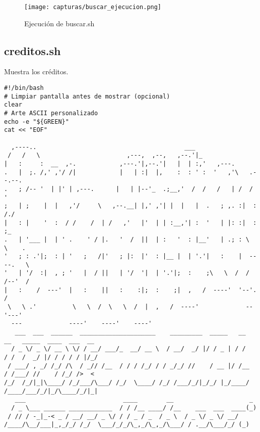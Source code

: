 \documentclass[12pt]{article}
\begin{document}
\begin{figure}[H]
    \centering
    \texttt{[image: capturas/buscar\_ejecucion.png]}
    \caption{Ejecución de buscar.sh}
\end{figure}


\newpage
\subsection{creditos.sh}
Muestra los créditos.

\begin{lstlisting}[caption={creditos.sh}]
#!/bin/bash
# Limpiar pantalla antes de mostrar (opcional)
clear
# Arte ASCII personalizado
echo -e "${GREEN}"
cat << "EOF"
                                            
  ,----..                                         ___                          
 /   /   \                        ,---,  ,--,   ,--.'|_                        
|   :     :  __  ,-.            ,---.'|,--.'|   |  | :,'   ,---.               
.   |  ;. /,' ,'/ /|            |   | :|  |,    :  : ' :  '   ,'\   .--.--.    
.   ; /-- '  | |' | ,---.      |   | |--'_  .;__,'  /  /   /   | /  /    '   
;   | ;    |  |   ,'/     \   ,--.__| |,' ,'| |  |   |  .   ; ,. :|  :  /./   
|   : |    '  :  / /    /  | /   ,'   |'  | | :__,'| :  '   | |: :|  :  ;_     
.   | '___ |  | ' .    ' / |.   '  /  ||  | :   '  : |__'   | .; : \  \    .  
'   ; : .'|;  : | '   ;   /|'   ; |:  |'  : |__ |  | '.'|   :    |  ----.   \ 
'   | '/  :|  , ; '   |  / ||   | '/  '|  | '.'|;  :    ;\   \  /  /  /--'  / 
|   :    /  ---'  |   :    ||   :    :|;  :    ;|  ,   /  ----'  '--'.     /  
 \   \ .'          \   \  /  \   \  /  |  ,   /  ----'             --'---'   
  ---             ----'    ----'    ----'                                 
   ___  ___  ______  _____________________    _________  _____   __     __   _____  ____  ___  __
  / _ \/ _ \/ __ \ \/ / __/ ___/_  __/ __ \  / __/  _/ |/ / _ | / /    / /  /  _/ |/ / / / / |/_/
 / ___/ , _/ /_/ /\  / _// /__  / / / /_/ / / _/_/ //    / __ |/ /__  / /___/ //    / /_/ />  <  
/_/  /_/|_|\____/ /_/___/\___/ /_/  \____/ /_/ /___/_/|_/_/ |_/____/ /____/___/_/|_/\____/_/|_|  
   ___                           ____        __                     _                                               
  / _ \___ ______ ____________  / / /__ ____/ /__    ___  ___  ____(_)                                              
 / // / -_|_-< _ / __/ __/ _ \/ / / _ / _  / _ \  / _ \/ _ \/ __/                                                 
/____/\__/___|_,_/_/ /_/  \___/_/_/\_,_/\_,_/\___/ / .__/\___/_/ (_)                                                

\end{lstlisting}
\end{document}
